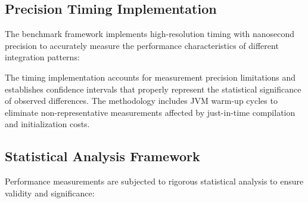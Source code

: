 \subsection{Precision Timing Implementation}

The benchmark framework implements high-resolution timing with nanosecond precision to accurately measure the performance characteristics of different integration patterns:


The timing implementation accounts for measurement precision limitations and establishes confidence intervals that properly represent the statistical significance of observed differences. The methodology includes JVM warm-up cycles to eliminate non-representative measurements affected by just-in-time compilation and initialization costs.

\subsection{Statistical Analysis Framework}

Performance measurements are subjected to rigorous statistical analysis to ensure validity and significance:

